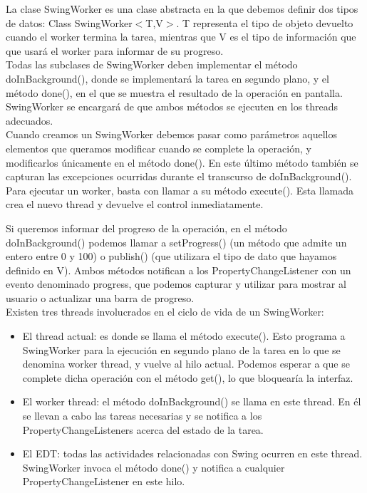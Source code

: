 \documentclass[12pt, a4paper]{book}
\begin{document}
La clase SwingWorker es una clase abstracta en la que debemos definir dos tipos de datos: Class SwingWorker$<$T,V$>$. T representa el tipo de objeto devuelto cuando el worker termina la tarea, mientras que V es el tipo de información que que usará el worker para informar de su progreso.\\

Todas las subclases de SwingWorker deben implementar el método doInBackground(), donde se implementará la tarea en segundo plano, y el método done(), en el que se muestra el resultado de la operación en pantalla. SwingWorker se encargará de que ambos métodos se ejecuten en los threads adecuados.\\

 Cuando creamos un SwingWorker debemos pasar como parámetros aquellos elementos que queramos modificar cuando se complete la operación, y modificarlos únicamente en el método done(). En este último método también se capturan las excepciones ocurridas durante el transcurso de doInBackground().\\
 
 Para ejecutar un worker, basta con llamar a su método execute(). Esta llamada crea el nuevo thread y devuelve el control inmediatamente.
 
 \newpage
 
Si queremos informar del progreso de la operación, en el método doInBackground() podemos llamar a setProgress() (un método que admite un entero entre 0 y 100) o publish() (que utilizara el tipo de dato que hayamos definido en V). Ambos métodos notifican a los PropertyChangeListener con un evento denominado progress, que podemos capturar y utilizar para mostrar al usuario o actualizar una barra de progreso.\\


Existen tres threads involucrados en el ciclo de vida de un SwingWorker:

\begin{itemize}
	\item El thread actual: es donde se llama el método execute(). Esto programa a SwingWorker para la ejecución en segundo plano de la tarea en lo que se denomina worker thread, y vuelve al hilo actual. Podemos esperar a que se complete dicha operación con el método get(), lo que bloquearía la interfaz.
	\item El worker thread: el método doInBackground() se llama en este thread. En él se llevan a cabo las tareas necesarias y se notifica a los PropertyChangeListeners acerca del estado de la tarea.
	\item El \gls{EDT}: todas las actividades relacionadas con Swing ocurren en este thread. SwingWorker invoca el método done() y notifica a cualquier PropertyChangeListener en este hilo.
\end{itemize}
\end{document}
